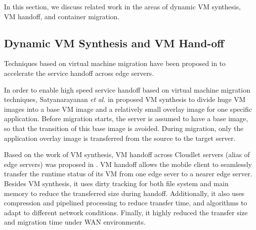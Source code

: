 In this section, we discuss related work in the areas of dynamic VM synthesis, VM handoff, and container migration.

\subsection{Dynamic VM Synthesis and VM Hand-off} \label{motivation:vmhandoff}

Techniques based on virtual machine migration have been proposed in  \cite{ha2015vmhandoff} \cite{satya2009case} to accelerate the service handoff across edge servers. 

In order to enable high speed service handoff based on virtual machine migration techniques, Satyanarayanan \textit{et al.} in \cite{satya2009case} proposed VM synthesis to divide huge VM images into a base VM image and a relatively small overlay image for one specific application. Before migration starts, the server is assumed to have a base image, so that the transition of this base image is avoided. During migration, only the application overlay image is transferred from the source to the target server.

Based on the work of VM synthesis, VM handoff across Cloudlet servers (alias of edge servers) was proposed in \cite{ha2015vmhandoff}. VM handoff allows the mobile client to seamlessly transfer the runtime status of its VM from one edge sever to a nearer edge server. Besides VM synthesis, it uses dirty tracking for both file system and main memory  to reduce the transferred size during handoff.
Additionally, it also uses compression and pipelined processing to reduce transfer time, and algorithms to adapt to different network conditions.
Finally, it highly reduced the transfer size and migration time under WAN environments.

